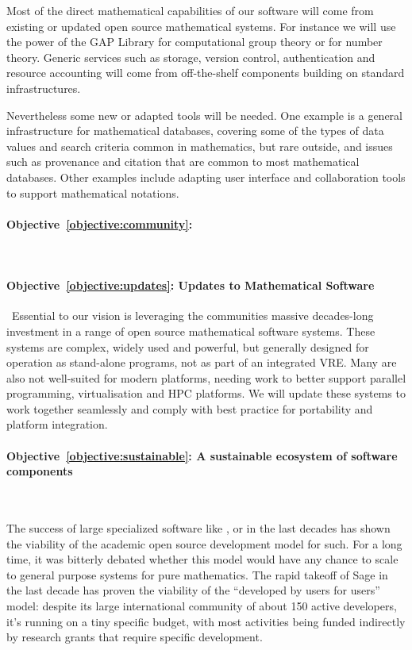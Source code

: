 \documentclass[a4paper,11pt]{article}
\begin{document}
Most of the direct mathematical capabilities of our software will come
from existing or updated open source mathematical systems. For instance we will
use the power of the GAP Library for computational group theory or
\PariGP for number theory. Generic services such as storage, version
control, authentication and resource accounting will come from
off-the-shelf components building on standard infrastructures. 

Nevertheless some new or adapted tools will be needed. One example is
a general infrastructure for mathematical databases, covering some of
the types of data values and search criteria common in mathematics,
but rare outside, and issues such as provenance and citation that are
common to most mathematical databases. Other examples include adapting
user interface and collaboration tools to support mathematical notations.




\paragraph{Objective~\ref{objective:community}: }\ 

\paragraph{Objective~\ref{objective:updates}: Updates to Mathematical Software}\ 
Essential to our vision is leveraging the communities massive
decades-long investment in a range of open source mathematical
software systems. These systems are complex, widely used and powerful,
but generally designed for operation as stand-alone programs, not as
part of an integrated VRE. Many are also not well-suited for modern
platforms, needing work to better support parallel programming,
virtualisation and HPC platforms. We will update these systems to work
together seamlessly and comply with best practice for portability and
platform integration.


\paragraph{Objective~\ref{objective:sustainable}: A sustainable
  ecosystem of software components}\ 

The success of large specialized software like \PariGP, \Singular or
\GAP in the last decades has shown the viability of the academic open
source development model for such. For a long time, it was bitterly
debated whether this model would have any chance to scale to general
purpose systems for pure mathematics. The rapid takeoff of Sage in the
last decade has proven the viability of the ``developed by users for
users'' model: despite its large international community of about 150
active developers, it's running on a tiny specific budget, with most
activities being funded indirectly by research grants that require
specific development.
\end{document}
